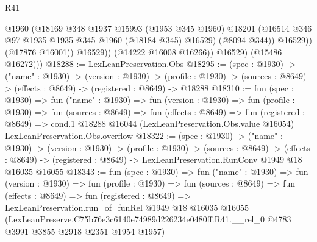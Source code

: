 \begin{lexlean}{R41}
\begin{coremodule}
                      @1960
                      (@18169
                        @348
                        @1937
                        @15993
                        (@1953 @345 @1960)
                        @18201
                        (@16514 @346 @97 @1935 @1935 @345 @1960 (@18184 @345) @16529)
                        (@8094 @344))
                      @16529))
                  (@17876 @16001))
                @16529))
            (@14222 @16008 @16266))
          @16529)
        (@15486 @16272)))
@18288 := LexLeanPreservation.Obs
@18295 := (spec : @1930) ->
  ("name" : @1930) ->
  (version : @1930) ->
  (profile : @1930) -> (sources : @8649) -> (effects : @8649) -> (registered : @8649) -> @18288
@18310 := fun (spec : @1930) =>
  fun ("name" : @1930) =>
  fun (version : @1930) =>
  fun (profile : @1930) =>
  fun (sources : @8649) =>
  fun (effects : @8649) =>
  fun (registered : @8649) =>
  cond.{1} @18288 @16044 (LexLeanPreservation.Obs.value @16054) LexLeanPreservation.Obs.overflow
@18322 := (spec : @1930) ->
  ("name" : @1930) ->
  (version : @1930) ->
  (profile : @1930) ->
  (sources : @8649) ->
  (effects : @8649) -> (registered : @8649) -> LexLeanPreservation.RunConv @1949 @18 @16035 @16055
@18343 := fun (spec : @1930) =>
  fun ("name" : @1930) =>
  fun (version : @1930) =>
  fun (profile : @1930) =>
  fun (sources : @8649) =>
  fun (effects : @8649) =>
  fun (registered : @8649) =>
  LexLeanPreservation.run_of_funRel
    @1949
    @18
    @16035
    @16055
    (LexLeanPreserve.C75b76e3c6140e74989d226234e0480ff.R41.__rel_0
      @4783
      @3991
      @3855
      @2918
      @2351
      @1954
      @1957)
\end{coremodule}
\end{lexlean}
